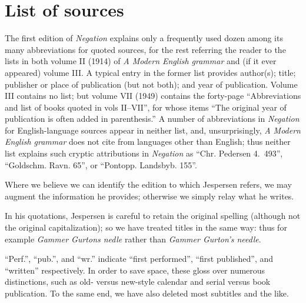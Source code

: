 \chapter{List of sources}

The first edition of \textit{Negation} explains only a frequently used dozen among its many abbreviations for quoted sources, for the rest referring the reader to the lists in both volume II %
(1914) of \textit{A Modern English grammar} and (if it ever appeared) volume III. A typical entry in the former list provides author(s); title; publisher or place of publication (but not both); and year of publication. Volume III contains no list; but volume VII (1949) contains the forty-page ``Abbreviations and list of books quoted in vols  II--VII'', for whose items ``The original year of publication is often added in parenthesis.'' %
A number of abbreviations in \textit{Negation} for English-language sources appear in neither list, and, unsurprisingly, \textit{A Modern English grammar} does not cite from languages other than English; thus neither list explains such cryptic attributions in \textit{Negation} as ``Chr. Pedersen 4.~493'', ``Goldschm. Ravn. 65'', or ``Pontopp. Landsbyb. 155''.

Where we believe we can identify the edition to which Jespersen refers, we may augment the information he provides; otherwise we simply relay what he writes.

In his quotations, Jespersen is careful to retain the original spelling (although not the original capitalization); so we have treated titles in the same way: thus for example \textit{Gammer Gurtons nedle} rather than \textit{Gammer Gurton's needle}.

``Perf.'', ``pub.'', and ``wr.'' indicate ``first performed'', ``first published'', and ``written'' respectively. In order to save space, these gloss over numerous distinctions, such as old- versus new-style calendar and serial versus book publication. To the same end, we have also deleted most subtitles and the like. %

